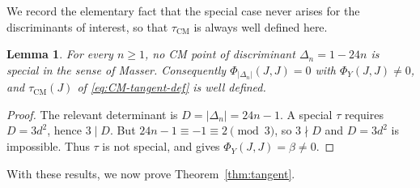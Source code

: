 \documentclass[12pt]{amsart}
\newtheorem{lemma}[theorem]{Lemma}
\theoremstyle{definition}
\theoremstyle{remark}
\begin{document}
We record the elementary fact that the special case never arises for the discriminants of
interest, so that $\tau_{\mathrm{CM}}$ is always well defined here.

\begin{lemma}\label{lem:generic}
For every $n\ge1$, no CM point of discriminant $\Delta_n=1-24n$ is special in the sense of
Masser. Consequently $\Phi_{|\Delta_n|}(J,J)=0$ with $\Phi_Y(J,J)\ne0$, and $\tau_{\mathrm{CM}}(J)$
of \eqref{eq:CM-tangent-def} is well defined.
\end{lemma}

\begin{proof}
The relevant determinant is $D=|\Delta_n|=24n-1$. A special $\tau$ requires $D=3d^2$, hence
$3\mid D$. But $24n-1\equiv -1\equiv 2\pmod 3$, so $3\nmid D$ and $D=3d^2$ is impossible.
Thus $\tau$ is not special, and  gives $\Phi_Y(J,J)=\beta\ne0$.
\end{proof}

With these results, we now prove Theorem~\ref{thm:tangent}.
\end{document}
